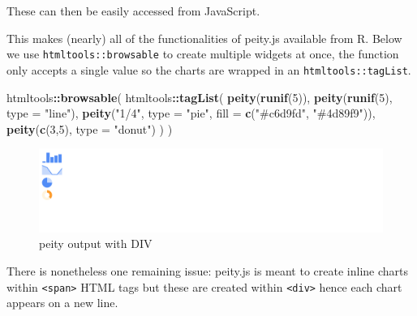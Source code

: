 \documentclass[
]{krantz}
\makeatletter
\newenvironment{Shaded}{\begin{snugshade}}{\end{snugshade}}
\newcommand{\AttributeTok}[1]{\textcolor[rgb]{0.61,0.61,0.61}{#1}}
\newcommand{\DataTypeTok}[1]{\textcolor[rgb]{0.27,0.27,0.27}{#1}}
\newcommand{\DecValTok}[1]{\textcolor[rgb]{0.06,0.06,0.06}{#1}}
\newcommand{\FunctionTok}[1]{\textcolor[rgb]{0,0,0}{#1}}
\newcommand{\KeywordTok}[1]{\textcolor[rgb]{0.27,0.27,0.27}{\textbf{#1}}}
\newcommand{\NormalTok}[1]{#1}
\newcommand{\OperatorTok}[1]{\textcolor[rgb]{0.43,0.43,0.43}{\textbf{#1}}}
\newcommand{\StringTok}[1]{\textcolor[rgb]{0.5,0.5,0.5}{#1}}
\newenvironment{kframe}{%
\medskip{}
\setlength{\fboxsep}{.8em}
 \def\at@end@of@kframe{}%
 \ifinner\ifhmode%
  \def\at@end@of@kframe{\end{minipage}}%
  \begin{minipage}{\columnwidth}%
 \fi\fi%
 \def\FrameCommand##1{\hskip\@totalleftmargin \hskip-\fboxsep
 \colorbox{shadecolor}{##1}\hskip-\fboxsep
     \hskip-\linewidth \hskip-\@totalleftmargin \hskip\columnwidth}%
 \MakeFramed {\advance\hsize-\width
   \@totalleftmargin\z@ \linewidth\hsize
   \@setminipage}}%
 {\par\unskip\endMakeFramed%
 \at@end@of@kframe}
\renewenvironment{Shaded}{\begin{kframe}}{\end{kframe}}
\makeatother
\begin{document}
These can then be easily accessed from JavaScript.

\begin{Shaded}
\end{Shaded}

This makes (nearly) all of the functionalities of peity.js available from R. Below we use \texttt{htmltools::browsable} to create multiple widgets at once, the function only accepts a single value so the charts are wrapped in an \texttt{htmltools::tagList}.

\begin{Shaded}
\begin{Highlighting}[]
\NormalTok{htmltools}\OperatorTok{::}\KeywordTok{browsable}\NormalTok{(}
\NormalTok{  htmltools}\OperatorTok{::}\KeywordTok{tagList}\NormalTok{(}
    \KeywordTok{peity}\NormalTok{(}\KeywordTok{runif}\NormalTok{(}\DecValTok{5}\NormalTok{)),}
    \KeywordTok{peity}\NormalTok{(}\KeywordTok{runif}\NormalTok{(}\DecValTok{5}\NormalTok{), }\DataTypeTok{type =} \StringTok{"line"}\NormalTok{),}
    \KeywordTok{peity}\NormalTok{(}\StringTok{"1/4"}\NormalTok{, }\DataTypeTok{type =} \StringTok{"pie"}\NormalTok{, }\DataTypeTok{fill =} \KeywordTok{c}\NormalTok{(}\StringTok{"\#c6d9fd"}\NormalTok{, }\StringTok{"\#4d89f9"}\NormalTok{)),}
    \KeywordTok{peity}\NormalTok{(}\KeywordTok{c}\NormalTok{(}\DecValTok{3}\NormalTok{,}\DecValTok{5}\NormalTok{), }\DataTypeTok{type =} \StringTok{"donut"}\NormalTok{)}
\NormalTok{  )}
\NormalTok{)}
\end{Highlighting}
\end{Shaded}

\begin{figure}
\centering
\includegraphics{images/peity-div.png}
\caption{peity output with DIV}
\end{figure}

There is nonetheless one remaining issue: peity.js is meant to create inline charts within \texttt{\textless{}span\textgreater{}} HTML tags but these are created within \texttt{\textless{}div\textgreater{}} hence each chart appears on a new line.
\end{document}
